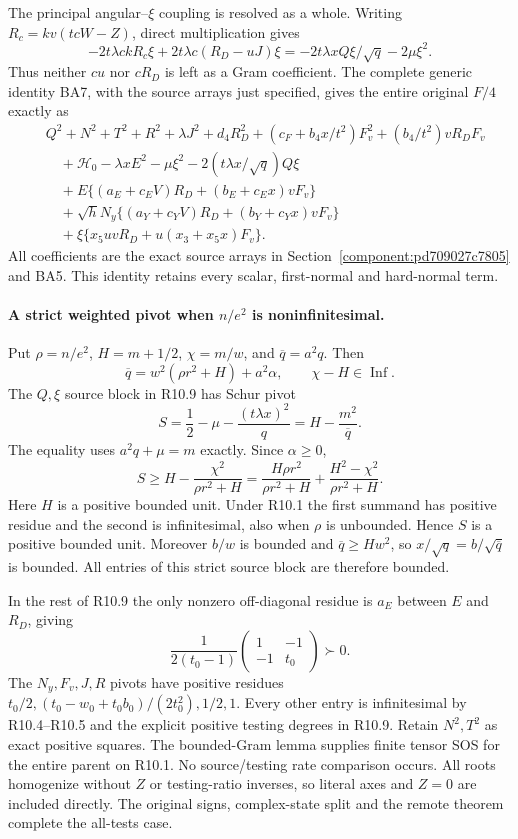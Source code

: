 The principal angular--$\xi$ coupling is resolved as a whole.
Writing $R_c=kv(tcW-Z)$, direct multiplication gives
\[
 -2t\lambda ck R_c\xi+2t\lambda c(R_D-uJ)\xi
 =-2t\lambda x Q\xi/\sqrt q-2\mu\xi^2.
\tag{R10.8}
\]
Thus neither $cu$ nor $cR_D$ is left as a Gram coefficient. The
complete generic identity BA7, with the source arrays just specified,
gives the entire original $F/4$ exactly as
\[
\begin{split}
 &Q^2+N^2+T^2+R^2+\lambda J^2+d_4R_D^2
 +(c_F+b_4x/t^2)F_v^2+(b_4/t^2)vR_DF_v\\
 &\quad+\mathcal H_0-\lambda xE^2-\mu\xi^2
                  -2(t\lambda x/\sqrt q)Q\xi\\
 &\quad+E\{(a_E+c_EV)R_D+(b_E+c_Ex)vF_v\}\\
 &\quad+\sqrt hN_y\{(a_Y+c_YV)R_D+(b_Y+c_Yx)vF_v\}\\
 &\quad+\xi\{x_5uvR_D+u(x_3+x_5x)F_v\}.
\end{split}
\tag{R10.9}
\]
All coefficients are the exact source arrays in
Section~\ref{component:pd709027c7805} and BA5.
This identity retains every scalar, first-normal and hard-normal term.

\paragraph{A strict weighted pivot when $n/e^2$ is noninfinitesimal.}
Put $\rho=n/e^2$, $H=m+1/2$, $\chi=m/w$, and
$\overline q=a^2q$. Then
\[
 \overline q=w^2(\rho r^2+H)+a^2\alpha,
 \qquad \chi-H\in\operatorname{Inf}.
\tag{R10.10}
\]
The $Q,\xi$ source block in R10.9 has Schur pivot
\[
 S=\frac12-\mu-\frac{(t\lambda x)^2}{q}
   =H-\frac{m^2}{\overline q}.
\tag{R10.11}
\]
The equality uses $a^2q+\mu=m$ exactly. Since $\alpha\ge0$,
\[
 S\ge H-\frac{\chi^2}{\rho r^2+H}
 =\frac{H\rho r^2}{\rho r^2+H}
    +\frac{H^2-\chi^2}{\rho r^2+H}.
\tag{R10.12}
\]
Here $H$ is a positive bounded unit. Under R10.1 the first summand
has positive residue and the second is infinitesimal, also when
$\rho$ is unbounded. Hence $S$ is a positive bounded unit.
Moreover $b/w$ is bounded and $\overline q\ge Hw^2$, so
$x/\sqrt q=b/\sqrt{\overline q}$ is bounded. All entries of this
strict source block are therefore bounded.

In the rest of R10.9 the only nonzero off-diagonal residue is
$a_E$ between $E$ and $R_D$, giving
\[
 \frac1{2(t_0-1)}
 \begin{pmatrix}1&-1\\-1&t_0\end{pmatrix}\succ0.
\]
The $N_y,F_v,J,R$ pivots have positive residues
$t_0/2,(t_0-w_0+t_0b_0)/(2t_0^2),1/2,1$.
Every other entry is infinitesimal by R10.4--R10.5 and the explicit
positive testing degrees in R10.9. Retain $N^2,T^2$ as exact positive
squares. The bounded-Gram lemma supplies finite tensor SOS for the
entire parent on R10.1. No source/testing rate comparison occurs.
All roots homogenize without $Z$ or testing-ratio inverses, so literal
axes and $Z=0$ are included directly. The original signs, complex-state
split and the remote theorem complete the all-tests case.

